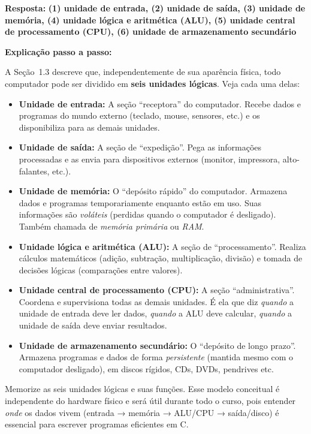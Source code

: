 \documentclass[12pt,a4paper]{article}
\begin{document}
\begin{respostabox}
\textbf{Resposta:} \textcolor{deitelblue}{\textbf{(1) unidade de entrada, (2) unidade de saída, (3) unidade de memória, (4) unidade lógica e aritmética (ALU), (5) unidade central de processamento (CPU), (6) unidade de armazenamento secundário}}

\medskip
\textbf{Explicação passo a passo:}

A Seção~1.3 descreve que, independentemente de sua aparência física, todo computador pode
ser dividido em \textbf{seis unidades lógicas}. Veja cada uma delas:

\begin{itemize}
  \item \textbf{Unidade de entrada:} A seção ``receptora'' do computador. Recebe dados e
  programas do mundo externo (teclado, mouse, sensores, etc.) e os disponibiliza para as
  demais unidades.

  \item \textbf{Unidade de saída:} A seção de ``expedição''. Pega as informações processadas
  e as envia para dispositivos externos (monitor, impressora, alto-falantes, etc.).

  \item \textbf{Unidade de memória:} O ``depósito rápido'' do computador. Armazena dados e
  programas temporariamente enquanto estão em uso. Suas informações são \textit{voláteis}
  (perdidas quando o computador é desligado). Também chamada de \textit{memória primária}
  ou \textit{RAM}.

  \item \textbf{Unidade lógica e aritmética (ALU):} A seção de ``processamento''. Realiza
  cálculos matemáticos (adição, subtração, multiplicação, divisão) e tomada de decisões
  lógicas (comparações entre valores).

  \item \textbf{Unidade central de processamento (CPU):} A seção ``administrativa''.
  Coordena e supervisiona todas as demais unidades. É ela que diz \textit{quando} a
  unidade de entrada deve ler dados, \textit{quando} a ALU deve calcular, \textit{quando}
  a unidade de saída deve enviar resultados.

  \item \textbf{Unidade de armazenamento secundário:} O ``depósito de longo prazo''.
  Armazena programas e dados de forma \textit{persistente} (mantida mesmo com o computador
  desligado), em discos rígidos, CDs, DVDs, pendrives etc.
\end{itemize}

\medskip
\begin{boaprática}
  Memorize as seis unidades lógicas e suas funções. Esse modelo conceitual
  é independente do hardware físico e será útil durante todo o curso, pois
  entender \textit{onde} os dados vivem (entrada → memória → ALU/CPU → saída/disco)
  é essencial para escrever programas eficientes em C.
\end{boaprática}
\end{respostabox}
\end{document}
